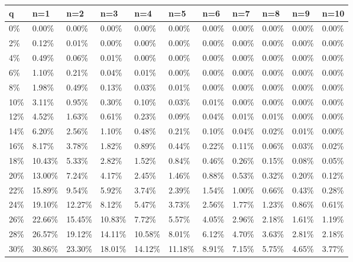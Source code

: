 \documentclass[letterpaper,12pt]{report}
\theoremstyle{plain}
\theoremstyle{definition}
\begin{document}
\begin{table}
\resizebox{18cm}{!} {
    \begin{tabular}{l|llllllllll}
    q  & n=1     & n=2     & n=3     & n=4     & n=5     & n=6     & n=7     & n=8     & n=9     & n=10    \\ \hline
    0\% & 0.00\%  & 0.00\%  & 0.00\%  & 0.00\%  & 0.00\%  & 0.00\%  & 0.00\%  & 0.00\%  & 0.00\%  & 0.00\%  \\
    2\% & 0.12\%  & 0.01\%  & 0.00\%  & 0.00\%  & 0.00\%  & 0.00\%  & 0.00\%  & 0.00\%  & 0.00\%  & 0.00\%  \\
    4\% & 0.49\%  & 0.06\%  & 0.01\%  & 0.00\%  & 0.00\%  & 0.00\%  & 0.00\%  & 0.00\%  & 0.00\%  & 0.00\%  \\
    6\% & 1.10\%  & 0.21\%  & 0.04\%  & 0.01\%  & 0.00\%  & 0.00\%  & 0.00\%  & 0.00\%  & 0.00\%  & 0.00\%  \\
    8\% & 1.98\%  & 0.49\%  & 0.13\%  & 0.03\%  & 0.01\%  & 0.00\%  & 0.00\%  & 0.00\%  & 0.00\%  & 0.00\%  \\
    10\% & 3.11\%  & 0.95\%  & 0.30\%  & 0.10\%  & 0.03\%  & 0.01\%  & 0.00\%  & 0.00\%  & 0.00\%  & 0.00\%  \\
    12\% & 4.52\%  & 1.63\%  & 0.61\%  & 0.23\%  & 0.09\%  & 0.04\%  & 0.01\%  & 0.01\%  & 0.00\%  & 0.00\%  \\
    14\% & 6.20\%  & 2.56\%  & 1.10\%  & 0.48\%  & 0.21\%  & 0.10\%  & 0.04\%  & 0.02\%  & 0.01\%  & 0.00\%  \\
    16\% & 8.17\%  & 3.78\%  & 1.82\%  & 0.89\%  & 0.44\%  & 0.22\%  & 0.11\%  & 0.06\%  & 0.03\%  & 0.02\%  \\
    18\% & 10.43\% & 5.33\%  & 2.82\%  & 1.52\%  & 0.84\%  & 0.46\%  & 0.26\%  & 0.15\%  & 0.08\%  & 0.05\%  \\
    20\% & 13.00\% & 7.24\%  & 4.17\%  & 2.45\%  & 1.46\%  & 0.88\%  & 0.53\%  & 0.32\%  & 0.20\%  & 0.12\%  \\
    22\% & 15.89\% & 9.54\%  & 5.92\%  & 3.74\%  & 2.39\%  & 1.54\%  & 1.00\%  & 0.66\%  & 0.43\%  & 0.28\%  \\
    24\% & 19.10\% & 12.27\% & 8.12\%  & 5.47\%  & 3.73\%  & 2.56\%  & 1.77\%  & 1.23\%  & 0.86\%  & 0.61\%  \\
    26\% & 22.66\% & 15.45\% & 10.83\% & 7.72\%  & 5.57\%  & 4.05\%  & 2.96\%  & 2.18\%  & 1.61\%  & 1.19\%  \\
    28\% & 26.57\% & 19.12\% & 14.11\% & 10.58\% & 8.01\%  & 6.12\%  & 4.70\%  & 3.63\%  & 2.81\%  & 2.18\%  \\
    30\% & 30.86\% & 23.30\% & 18.01\% & 14.12\% & 11.18\% & 8.91\%  & 7.15\%  & 5.75\%  & 4.65\%  & 3.77\%  \\

\end{tabular}}
\end{table}
\end{document}
